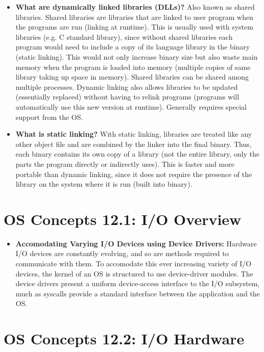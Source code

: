 \documentclass[12pt]{article}
\begin{document}
\begin{itemize}
    \item \textbf{What are dynamically linked libraries (DLLs)?} Also known as shared libraries. Shared libraries are libraries that are linked to user program when the programs are run (linking at runtime). This is usually used with system libraries (e.g. C standard library), since without shared libraries each program would need to include a copy of its language library in the binary (static linking). This would not only increase binary size but also waste main memory when the program is loaded into memory (multiple copies of same library taking up space in memory). Shared libraries can be shared among multiple processes. Dynamic linking also allows libraries to be updated (essentially replaced) without having to relink programs (programs will automatically use this new version at runtime). Generally requires special support from the OS.
    \item \textbf{What is static linking?} With static linking, libraries are treated like any other object file and are combined by the linker into the final binary. Thus, each binary contains its own copy of a library (not the entire library, only the parts the program directly or indirectly uses). This is faster and more portable than dynamic linking, since it does not require the presence of the library on the system where it is run (built into binary).
\end{itemize}

\section*{OS Concepts 12.1: I/O Overview}

\begin{itemize}
    \item \textbf{Accomodating Varying I/O Devices using Device Drivers:} Hardware I/O devices are constantly evolving, and so are methods required to communicate with them. To accomodate this ever increasing variety of I/O devices, the kernel of an OS is structured to use device-driver modules. The device drivers present a uniform device-access interface to the I/O subsystem, much as syscalls provide a standard interface between the application and the OS.
\end{itemize}

\section*{OS Concepts 12.2: I/O Hardware}
\end{document}
